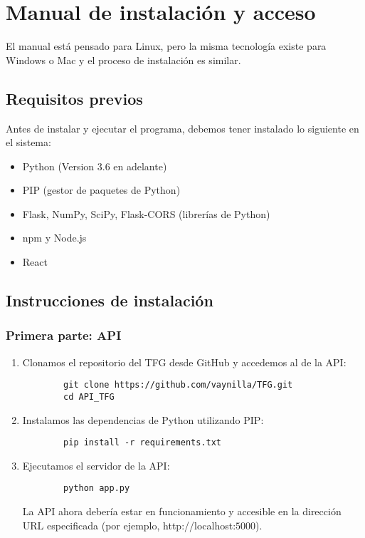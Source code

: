 \chapter{Manual de instalación y acceso}\label{ap:apendice1}
El manual está pensado para Linux, pero la misma tecnología existe para Windows o Mac y el proceso de instalación es similar.
\section{Requisitos previos}
Antes de instalar y ejecutar el programa, debemos tener instalado lo siguiente en el sistema:
\begin{itemize}
	\item Python (Version 3.6 en adelante)
	\item PIP (gestor de paquetes de Python)
	\item Flask, NumPy, SciPy, Flask-CORS (librerías de Python)
	\item npm y Node.js
	\item React
\end{itemize}
\section{Instrucciones de instalación}
\subsection{Primera parte: API}
\begin{enumerate}
	\item Clonamos el repositorio del TFG desde GitHub y accedemos al de la API:
	\begin{verbatim}
		git clone https://github.com/vaynilla/TFG.git
		cd API_TFG
	\end{verbatim}
	\item Instalamos las dependencias de Python utilizando PIP:
	\begin{verbatim}
		pip install -r requirements.txt
	\end{verbatim}
	\item Ejecutamos el servidor de la API:
	\begin{verbatim}
		python app.py
	\end{verbatim}
	La API ahora debería estar en funcionamiento y accesible en la dirección URL especificada (por ejemplo, http://localhost:$5000$).
\end{enumerate}
